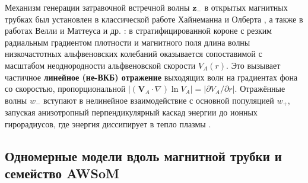 \documentclass[11pt,a4paper]{article}
\begin{document}
Механизм генерации затравочной встречной волны $\bm{z}_-$ в открытых магнитных трубках был установлен в классической работе Хайнеманна и Олберта \cite{HeinemannOlbert1980}, а также в работах Велли \cite{Velli1993} и Маттеуса и др. \cite{Matthaeus1999}: в стратифицированной короне с резким радиальным градиентом плотности и магнитного поля длина волны низкочастотных альфвеновских колебаний оказывается сопоставимой с масштабом неоднородности альфвеновской скорости $V_A(r)$. Это вызывает частичное \textbf{линейное (не-ВКБ) отражение} выходящих волн на градиентах фона со скоростью, пропорциональной $|(\bm{V}_A\cdot\nabla)\ln V_A| = |\partial V_A/\partial r|$. Отражённые волны $w_-$ вступают в нелинейное взаимодействие с основной популяцией $w_+$, запуская анизотропный перпендикулярный каскад энергии до ионных гирорадиусов, где энергия диссипирует в тепло плазмы \cite{GoldreichSridhar1995,Dmitruk2002}.

\subsection{Одномерные модели вдоль магнитной трубки и семейство AWSoM}
\end{document}
